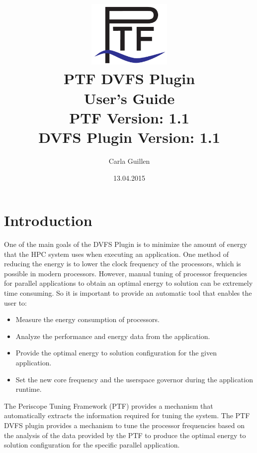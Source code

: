 \documentclass[11pt,a4paper, oneside]{book} %
\begin{document}
\title{\includegraphics[width=4cm]{../images/Ptf_LogoBlau}\\ \vspace{1cm}
\textsf{\bf \huge PTF DVFS Plugin\\ User's Guide }\\
       \normalsize PTF Version: 1.1\\
       DVFS Plugin Version: 1.1}
\author{Carla Guillen}
\date{13.04.2015}



\maketitle
\tableofcontents

\chapter{Introduction}
One of the main goals of the DVFS Plugin is to minimize the amount of energy that the HPC system uses when executing an application. One method of reducing the energy is to lower
the clock frequency of the processors, which is possible in modern processors. However, manual tuning of processor frequencies for parallel applications to
obtain an optimal energy to solution can be extremely time consuming. So it is important to provide an automatic tool that enables the user to:
\begin{itemize}
  \item Measure the energy consumption of processors.
  \item Analyze the performance and energy data from the application.
  \item Provide the optimal energy to solution configuration for the given application.
  \item Set the new core frequency and the userspace governor during the application runtime.
\end{itemize}
The Periscope Tuning Framework (PTF) provides a mechanism that automatically extracts the information required for tuning the system. The PTF DVFS plugin provides a
mechanism to tune the processor frequencies based on the analysis of the data provided by the PTF to produce the optimal energy to solution configuration for the specific parallel
application.
\end{document}
